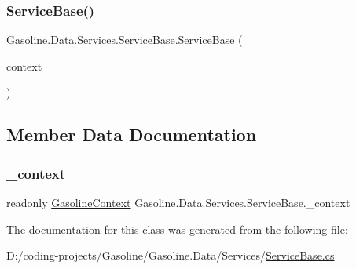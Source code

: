 \subsubsection{\texorpdfstring{ServiceBase()}{ServiceBase()}}
{\footnotesize\ttfamily Gasoline.\+Data.\+Services.\+Service\+Base.\+Service\+Base (\begin{DoxyParamCaption}\item[{\mbox{\hyperlink{class_gasoline_1_1_data_1_1_e_f_1_1_gasoline_context}{Gasoline\+Context}}}]{context }\end{DoxyParamCaption})}



\subsection{Member Data Documentation}
\mbox{\label{class_gasoline_1_1_data_1_1_services_1_1_service_base_abdf86048556d01a83e3a382c1508d17f}} 
\subsubsection{\texorpdfstring{\_context}{\_context}}
{\footnotesize\ttfamily readonly \mbox{\hyperlink{class_gasoline_1_1_data_1_1_e_f_1_1_gasoline_context}{Gasoline\+Context}} Gasoline.\+Data.\+Services.\+Service\+Base.\+\_\+context\hspace{0.3cm}{\ttfamily [protected]}}



The documentation for this class was generated from the following file\+:\begin{DoxyCompactItemize}
\item 
D\+:/coding-\/projects/\+Gasoline/\+Gasoline.\+Data/\+Services/\mbox{\hyperlink{_service_base_8cs}{Service\+Base.\+cs}}\end{DoxyCompactItemize}
